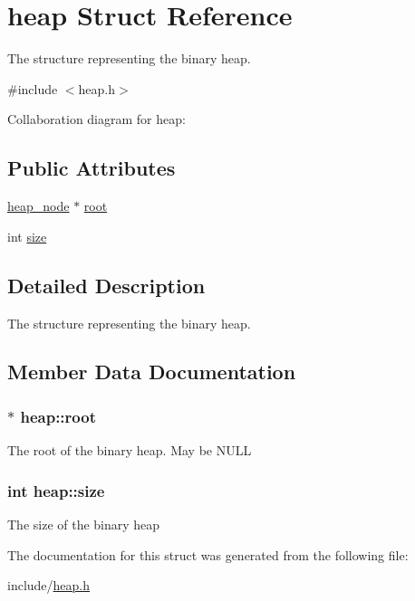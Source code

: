 \hypertarget{structheap}{\section{heap Struct Reference}
\label{structheap}
}


The structure representing the binary heap.  




{\ttfamily \#include $<$heap.\-h$>$}



Collaboration diagram for heap\-:
\subsection*{Public Attributes}
\begin{DoxyCompactItemize}
\item 
\hyperlink{structheap__node}{heap\-\_\-node} $\ast$ \hyperlink{structheap_a6aaa3cff0d7bf03e4779ed802fde2707}{root}
\item 
int \hyperlink{structheap_a5bbb507292d7c47325df66148cc2e32f}{size}
\end{DoxyCompactItemize}


\subsection{Detailed Description}
The structure representing the binary heap. 

\subsection{Member Data Documentation}
\hypertarget{structheap_a6aaa3cff0d7bf03e4779ed802fde2707}{
\subsubsection[{root}]{$\ast$ heap\-::root}}\label{structheap_a6aaa3cff0d7bf03e4779ed802fde2707}
The root of the binary heap. May be {\ttfamily N\-U\-L\-L} \hypertarget{structheap_a5bbb507292d7c47325df66148cc2e32f}{
\subsubsection[{size}]{\setlength{\rightskip}{0pt plus 5cm}int heap\-::size}}\label{structheap_a5bbb507292d7c47325df66148cc2e32f}
The size of the binary heap 

The documentation for this struct was generated from the following file\-:\begin{DoxyCompactItemize}
\item 
include/\hyperlink{heap_8h}{heap.\-h}\end{DoxyCompactItemize}
